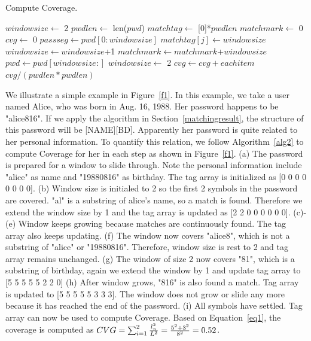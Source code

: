 \begin{algorithm}[!]
\caption{Compute Coverage.}
\label{alg2}
\begin{algorithmic}[1]
\State $windowsize \gets$ 2
\State $pwdlen \gets$ len($pwd$)
\State $matchtag \gets$ [0]*$pwdlen$
\State $matchmark \gets $ 0
\State $cvg \gets $ 0
\State $passseg \gets pwd[0:windowsize]$
\State $matchtag[j] \gets windowsize$
\EndFor
{}
\State $windowsize \gets windowsize$+1
\EndIf
\Else
\State $matchmark \gets matchmark$+$windowsize$
\State $pwd \gets pwd[windowsize:]$
\State $windowsize \gets$ 2
\EndIf
\EndWhile
{}
\State $cvg \gets cvg + eachitem$
\EndFor
\State \Return $cvg/(pwdlen * pwdlen)$
\EndProcedure
\end{algorithmic}
\end{algorithm}

We illustrate a simple example in Figure~\ref{f1}. In this example, we take a user named Alice, who was born in Aug. 16, 1988. Her password happens to be "alice816". If we apply the algorithm in Section~\ref{matchingresult}, the structure of this password will be [NAME][BD]. Apparently her password is quite related to her personal information. To quantify this relation, we follow Algorithm~\ref{alg2} to compute Coverage for her in each step as shown in Figure~\ref{f1}. (a) The password is prepared for a window to slide through. Note the personal information include "alice" as name and "19880816" as birthday. The tag array is initialized as [0 0 0 0 0 0 0 0]. (b) Window size is initialed to 2 so the first 2 symbols in the password are covered. "al" is a substring of alice's name, so a match is found. Therefore we extend the window size by 1 and the tag array is updated as [2 2 0 0 0 0 0 0]. (c)-(e) Window keeps growing because matches are continuously found. The tag array also keeps updating. (f) The window now covers "alice8", which is not a substring of "alice" or "19880816". Therefore, window size is rest to 2 and tag array remains unchanged. (g) The window of size 2 now covers "81", which is a substring of birthday, again we extend the window by 1 and update tag array to [5 5 5 5 5 2 2 0] (h) After window grows, "816" is also found a match. Tag array is updated to [5 5 5 5 5 3 3 3]. The window does not grow or slide any more because it has reached the end of the password. (i) All symbols have settled. Tag array can now be used to compute Coverage. Based on Equation~\ref{eq1}, the coverage is computed as $CVG  = \sum_{i=1}^2 {{l_n^2} \over {L^2}} = {{5^2 + 3^2}\over{8^2}}= 0.52$.

